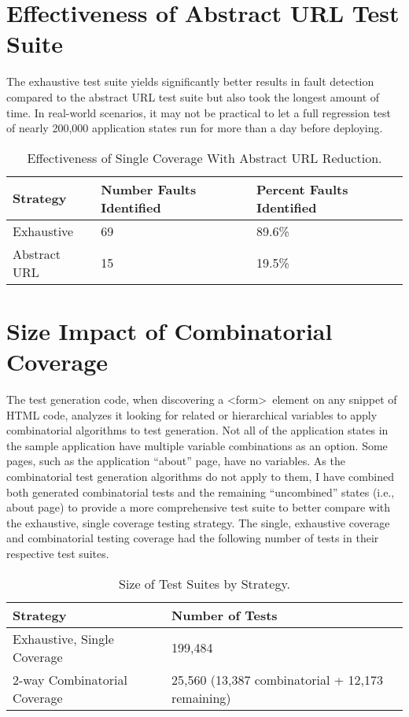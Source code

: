 \section{Effectiveness of Abstract URL Test Suite}

The exhaustive test suite yields significantly better results in fault detection compared to the abstract URL test suite but also took the longest amount of time.  In real-world scenarios, it may not be practical to let a full regression test of nearly 200,000 application states run for more than a day before deploying.

\begin{table}[h]
	\centering
	\caption{Effectiveness of Single Coverage With Abstract URL Reduction.}
	\begin{tabular}{| l | l | l |}
		\hline
  Strategy 					& 	Number Faults Identified		&	Percent Faults Identified		\\ \hline
  Exhaustive 				& 	69						&	89.6\%					\\ \hline
   Abstract URL 		& 	15						&	19.5\%					\\
		\hline
	\end{tabular}
\label{table:reducedEffectiveness}
\end{table}

\section{Size Impact of Combinatorial Coverage}

The test generation code, when discovering a \textless form\textgreater\ element on any snippet of HTML code, analyzes it looking for related or hierarchical variables to apply combinatorial algorithms to test generation.  Not all of the application states in the sample application have multiple variable combinations as an option.  Some pages, such as the application ``about'' page, have no variables.  As the combinatorial test generation algorithms do not apply to them, I have combined both generated combinatorial tests and the remaining ``uncombined'' states (i.e., about page) to provide a more comprehensive test suite to better compare with the exhaustive, single coverage testing strategy.  The single, exhaustive coverage and combinatorial testing coverage had the following number of tests in their respective test suites.

\begin{table}[h]
	\centering
	\caption{Size of Test Suites by Strategy.}
	\begin{tabular}{| l | l |}
		\hline
  Strategy 						& 	Number of Tests				\\ \hline
  Exhaustive, Single Coverage 		& 	199,484						\\ \hline
  2-way Combinatorial Coverage	& 	25,560 (13,387 combinatorial + 12,173 remaining)	\\
		\hline
	\end{tabular}
\label{table:combinatorialSize}
\end{table}

